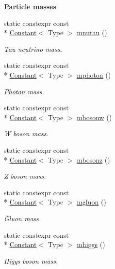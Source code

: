 \begin{Indent}{\bf Particle masses}
\begin{DoxyCompactItemize}
static constexpr const \\*
\hyperlink{exceptionmagrathea_1_1Constant}{Constant}$<$ Type $>$ \hyperlink{exceptionmagrathea_1_1Constants_a4c648efdb2b1e5382fe6176083d0a01e}{mnutau} ()
\begin{DoxyCompactList}\small\item\em Tau neutrino mass. \end{DoxyCompactList}\item 
static constexpr const \\*
\hyperlink{exceptionmagrathea_1_1Constant}{Constant}$<$ Type $>$ \hyperlink{exceptionmagrathea_1_1Constants_aef154a858839ba17f7456b1dbf98f8fc}{mphoton} ()
\begin{DoxyCompactList}\small\item\em \hyperlink{exceptionPhoton}{Photon} mass. \end{DoxyCompactList}\item 
static constexpr const \\*
\hyperlink{exceptionmagrathea_1_1Constant}{Constant}$<$ Type $>$ \hyperlink{exceptionmagrathea_1_1Constants_aabf1ac6c3632fbcbd7db7ccee2a2d4dd}{mbosonw} ()
\begin{DoxyCompactList}\small\item\em W boson mass. \end{DoxyCompactList}\item 
static constexpr const \\*
\hyperlink{exceptionmagrathea_1_1Constant}{Constant}$<$ Type $>$ \hyperlink{exceptionmagrathea_1_1Constants_a5ce940d0c0523eb4af235866c88d62d8}{mbosonz} ()
\begin{DoxyCompactList}\small\item\em Z boson mass. \end{DoxyCompactList}\item 
static constexpr const \\*
\hyperlink{exceptionmagrathea_1_1Constant}{Constant}$<$ Type $>$ \hyperlink{exceptionmagrathea_1_1Constants_a70ba2aa7cb295d8e1ce750b60e492792}{mgluon} ()
\begin{DoxyCompactList}\small\item\em Gluon mass. \end{DoxyCompactList}\item 
static constexpr const \\*
\hyperlink{exceptionmagrathea_1_1Constant}{Constant}$<$ Type $>$ \hyperlink{exceptionmagrathea_1_1Constants_abd96d156ad678cb5eaede9ef46662c0d}{mhiggs} ()
\begin{DoxyCompactList}\small\item\em Higgs boson mass. \end{DoxyCompactList}\item 

\end{DoxyCompactItemize}
\end{Indent}
